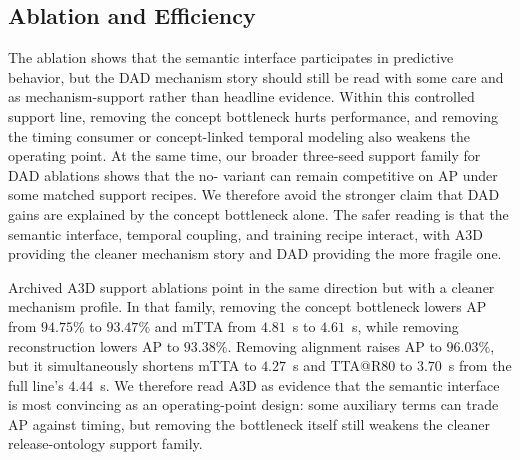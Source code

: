 \subsection{Ablation and Efficiency}

\begin{table}[t]
\caption{[Controlled support evidence] Component ablation on DAD under a
controlled support protocol. These runs are not the canonical headline
line; their purpose is to
isolate how much the concept interface and its support modules matter under a
shared recipe.}
\label{tab:ablation}
\centering\footnotesize
\TableStyleOn
\setlength{\tabcolsep}{4pt}
\TableStyleOff
\end{table}

The ablation shows that the semantic interface participates in predictive
behavior, but the DAD mechanism story should still be read with some care and as
mechanism-support rather than headline evidence. Within this controlled support
line, removing the concept bottleneck hurts performance, and removing the
timing consumer or concept-linked temporal modeling also weakens the operating
point. At the same time, our broader three-seed support family for DAD ablations
shows that the no-\cbm{} variant can remain competitive on AP under some matched
support recipes. We therefore avoid the stronger claim that DAD gains are
explained by the concept bottleneck alone. The safer reading is that the
semantic interface, temporal coupling, and training recipe interact, with A3D
providing the cleaner mechanism story and DAD providing the more fragile one.

Archived A3D support ablations point in the same direction but with a cleaner
mechanism profile. In that family, removing the concept bottleneck lowers AP
from $94.75\%$ to $93.47\%$ and mTTA from $4.81$~s to $4.61$~s, while removing
reconstruction lowers AP to $93.38\%$. Removing alignment raises AP to
$96.03\%$, but it simultaneously shortens mTTA to $4.27$~s and TTA@R80 to
$3.70$~s from the full line's $4.44$~s. We therefore read A3D as evidence that
the semantic interface is most convincing as an operating-point design: some
auxiliary terms can trade AP against timing, but removing the bottleneck itself
still weakens the cleaner release-ontology support family.

